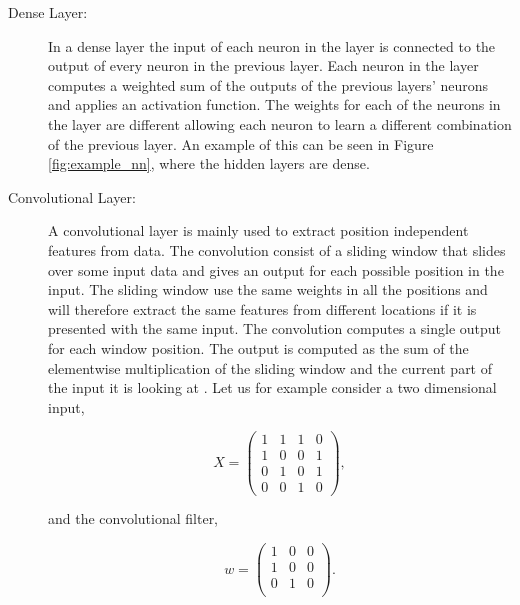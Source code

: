 \begin{description}

    \item[Dense Layer:]

        In a dense layer the input of each neuron in the layer is connected to
        the output of every neuron in the previous layer. Each neuron in the
        layer computes a weighted sum of the outputs of the previous layers'
        neurons and applies an activation function. The weights for each of
        the neurons in the layer are different allowing each neuron to learn a
        different combination of the previous layer. An example of this can be
        seen in Figure \ref{fig:example_nn}, where the hidden layers are dense.

    \item[Convolutional Layer:]

        A convolutional layer is mainly used to extract position independent
        features from data. The convolution consist of a sliding window that
        slides over some input data and gives an output for each possible
        position in the input. The sliding window use the same weights
        in all the positions and will therefore extract the same features from
        different locations if it is presented with the same input. The
        convolution computes a single output for each window position. The
        output is computed as the sum of the elementwise multiplication of
        the sliding window and the current part of the input it is looking at
        \citep{oshea2015}. Let us for example consider a two dimensional input,

        \begin{equation}
            X = \begin{pmatrix}
                1 & 1 & 1 & 0 \\
                1 & 0 & 0 & 1 \\
                0 & 1 & 0 & 1 \\
                0 & 0 & 1 & 0
            \end{pmatrix},
        \end{equation}

        and the convolutional filter,

        \begin{equation}
            w = \begin{pmatrix}
                1 & 0 & 0 \\
                1 & 0 & 0 \\
                0 & 1 & 0 \\
            \end{pmatrix}.
        \end{equation}


\end{description}
